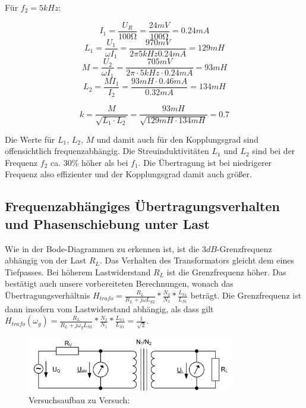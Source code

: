 \documentclass[a4paper]{article}
\begin{document}

Für $f_2=5\si{kHz}$:


$$I_1=\frac{U_R}{100\si{\ohm}}=\frac{24\si{mV}}{100\si{\ohm}}=0.24\si{mA}$$
$$L_1=\frac{U_1}{\omega I_1}=\frac{970\si{mV}}{2 \pi 5\si{kHz} 0.24\si{mA}}=129\si{mH}$$
$$M=\frac{U_2}{\omega I_1}=\frac{705\si{mV}}{2 \pi \cdot 5\si{kHz} \cdot 0.24\si{mA}}=93\si{mH}$$
$$L_2=\frac{M I_1}{I_2}=\frac{93\si{mH} \cdot 0.46\si{mA}}{0.32\si{mA}}=134\si{mH}$$

$$k=\frac{M}{\sqrt{L_1\cdot L_2}}=\frac{93\si{mH}}{\sqrt{129\si{mH} \cdot 134\si{mH}}} = 0.7$$

Die Werte für $L_1$, $L_2$, $M$ und damit auch für den Kopplungsgrad sind offensichtlich frequenzabhängig.
Die Streuinduktivitäten $L_1$ und $L_2$ sind bei der Frequenz $f_2$ ca. $30\%$ höher als bei $f_1$. Die Übertragung ist bei niedrigerer Frequenz also effizienter und der Kopplungsgrad damit auch größer.
\subsection{Frequenzabhängiges Übertragungsverhalten und Phasenschiebung unter Last}
\label{subsec:Versuch4-Frequenz}

Wie in der Bode-Diagrammen zu erkennen ist, ist die $3\si{dB}$-Grenzfrequenz abhängig von der Last $R_L$. Das Verhalten des Transformators gleicht dem eines Tiefpasses. Bei höherem Lastwiderstand $R_L$ ist die Grenzfrequenz höher. Das bestätigt auch unsere vorbereiteten Berechnungen, wonach das Übertragungsverhältnis $H_\textit{trafo}=\frac{R_L}{R_L+j\omega L_\textit{S2}}*\frac{N_2}{N_1}*\frac{L_{h1}}{L_{S1}}$ beträgt. Die Grenzfrequenz ist dann insofern vom Lastwiderstand abhängig, als dass gilt $H_\textit{trafo}(\omega_g)=\frac{R_L}{R_L+j\omega_g L_\textit{S2}}*\frac{N_2}{N_1}*\frac{L_{h1}}{L_{S1}}=\frac{1}{\sqrt{2}}$.

\begin{figure}[H]
    \centering
    \includegraphics[width=0.8\textwidth]{versuch4/versuchsaufbau-4.png}
    \caption[Schaltplan]{Versuchsaufbau zu Versuch: }
    \label{fig:4-versuchsaufbau}
\end{figure}
\end{document}
